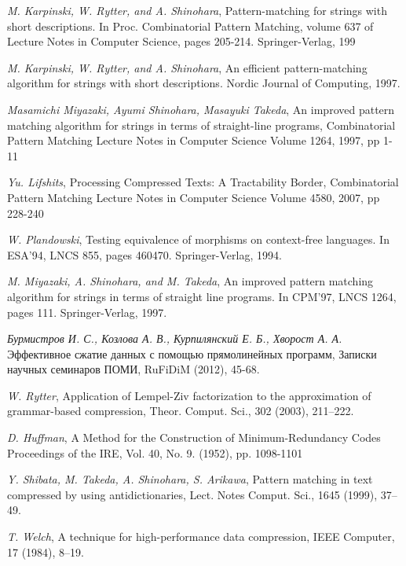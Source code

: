 \documentclass[14pt]{article}
\begin{document}
\begin{thebibliography}{99}

\textsl{M. Karpinski, W. Rytter, and A. Shinohara}, Pattern-matching for strings with short
descriptions. In Proc. Combinatorial Pattern Matching, volume 637 of Lecture Notes in
Computer Science, pages 205-214. Springer-Verlag, 199


\textsl{M. Karpinski, W. Rytter, and A. Shinohara}, An efficient pattern-matching algorithm for
strings with short descriptions. Nordic Journal of Computing, 1997. 

\textsl{Masamichi Miyazaki, Ayumi Shinohara, Masayuki Takeda}, An improved pattern matching algorithm for
strings in terms of straight-line programs, Combinatorial Pattern Matching
Lecture Notes in Computer Science Volume 1264, 1997, pp 1-11

\textsl{Yu. Lifshits}, Processing Compressed Texts: A Tractability Border, Combinatorial Pattern Matching
Lecture Notes in Computer Science Volume 4580, 2007, pp 228-240

\textsl{W. Plandowski}, Testing equivalence of morphisms on context-free languages. In
ESA'94, LNCS 855, pages 460470. Springer-Verlag, 1994.

\textsl{M. Miyazaki, A. Shinohara, and M. Takeda}, An improved pattern matching algorithm
for strings in terms of straight line programs. In CPM'97, LNCS 1264,
pages 111. Springer-Verlag, 1997.

\textsl{Бурмистров И. С., Козлова А. В., Курпилянский Е. Б., Хворост А. А.} Эффективное сжатие данных с помощью прямолинейных программ, Записки научных семинаров ПОМИ, RuFiDiM (2012), 45-68.

\textsl{W. Rytter}, Application of Lempel-Ziv factorization to the approximation of
grammar-based compression, Theor. Comput. Sci., 302 (2003), 211–222.

\textsl{D. Huffman},
A Method for the Construction of Minimum-Redundancy Codes Proceedings of the IRE, Vol. 40, No. 9. (1952), pp. 1098-1101 

\textsl{Y. Shibata, M. Takeda, A. Shinohara, S. Arikawa}, Pattern matching in text compressed by using antidictionaries, Lect. Notes Comput. Sci., 1645 (1999), 37–49.

\textsl{T. Welch}, A technique for high-performance data compression, IEEE Computer, 17 (1984), 8–19.


\end{thebibliography}
\end{document}
